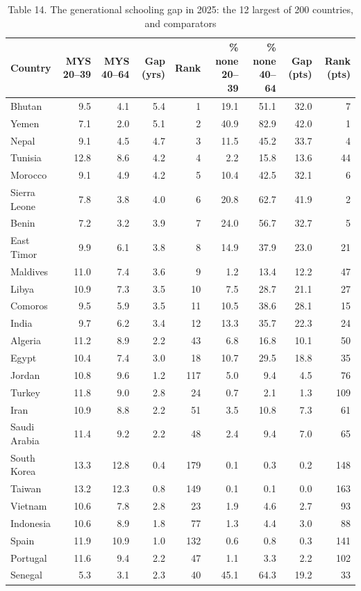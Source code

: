 \begin{table}
\caption{Table 14. The generational schooling gap in 2025: the 12 largest of 200 countries, and comparators}
\label{tab:T14_generational_gap}
\begin{tabular}{lrrrrrrrr}
\toprule
Country & MYS 20–39 & MYS 40–64 & Gap (yrs) & Rank & \% none 20–39 & \% none 40–64 & Gap (pts) & Rank (pts) \\
\midrule
Bhutan & 9.5 & 4.1 & 5.4 & 1 & 19.1 & 51.1 & 32.0 & 7 \\
Yemen & 7.1 & 2.0 & 5.1 & 2 & 40.9 & 82.9 & 42.0 & 1 \\
Nepal & 9.1 & 4.5 & 4.7 & 3 & 11.5 & 45.2 & 33.7 & 4 \\
Tunisia & 12.8 & 8.6 & 4.2 & 4 & 2.2 & 15.8 & 13.6 & 44 \\
Morocco & 9.1 & 4.9 & 4.2 & 5 & 10.4 & 42.5 & 32.1 & 6 \\
Sierra Leone & 7.8 & 3.8 & 4.0 & 6 & 20.8 & 62.7 & 41.9 & 2 \\
Benin & 7.2 & 3.2 & 3.9 & 7 & 24.0 & 56.7 & 32.7 & 5 \\
East Timor & 9.9 & 6.1 & 3.8 & 8 & 14.9 & 37.9 & 23.0 & 21 \\
Maldives & 11.0 & 7.4 & 3.6 & 9 & 1.2 & 13.4 & 12.2 & 47 \\
Libya & 10.9 & 7.3 & 3.5 & 10 & 7.5 & 28.7 & 21.1 & 27 \\
Comoros & 9.5 & 5.9 & 3.5 & 11 & 10.5 & 38.6 & 28.1 & 15 \\
India & 9.7 & 6.2 & 3.4 & 12 & 13.3 & 35.7 & 22.3 & 24 \\
Algeria & 11.2 & 8.9 & 2.2 & 43 & 6.8 & 16.8 & 10.1 & 50 \\
Egypt & 10.4 & 7.4 & 3.0 & 18 & 10.7 & 29.5 & 18.8 & 35 \\
Jordan & 10.8 & 9.6 & 1.2 & 117 & 5.0 & 9.4 & 4.5 & 76 \\
Turkey & 11.8 & 9.0 & 2.8 & 24 & 0.7 & 2.1 & 1.3 & 109 \\
Iran & 10.9 & 8.8 & 2.2 & 51 & 3.5 & 10.8 & 7.3 & 61 \\
Saudi Arabia & 11.4 & 9.2 & 2.2 & 48 & 2.4 & 9.4 & 7.0 & 65 \\
South Korea & 13.3 & 12.8 & 0.4 & 179 & 0.1 & 0.3 & 0.2 & 148 \\
Taiwan & 13.2 & 12.3 & 0.8 & 149 & 0.1 & 0.1 & 0.0 & 163 \\
Vietnam & 10.6 & 7.8 & 2.8 & 23 & 1.9 & 4.6 & 2.7 & 93 \\
Indonesia & 10.6 & 8.9 & 1.8 & 77 & 1.3 & 4.4 & 3.0 & 88 \\
Spain & 11.9 & 10.9 & 1.0 & 132 & 0.6 & 0.8 & 0.3 & 141 \\
Portugal & 11.6 & 9.4 & 2.2 & 47 & 1.1 & 3.3 & 2.2 & 102 \\
Senegal & 5.3 & 3.1 & 2.3 & 40 & 45.1 & 64.3 & 19.2 & 33 \\
\bottomrule
\end{tabular}
\end{table}
